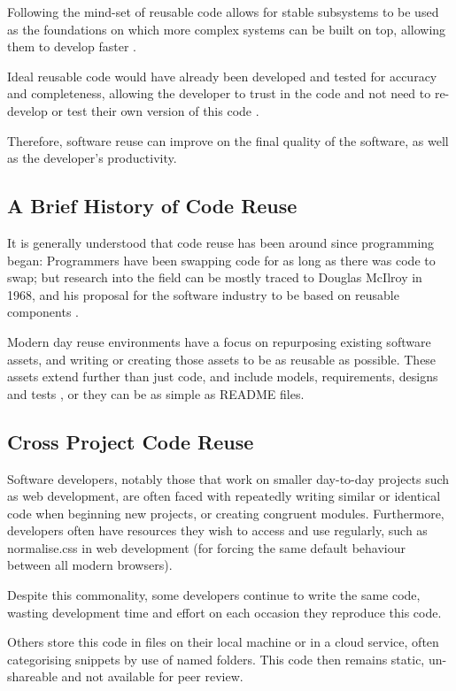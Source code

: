 \documentclass[11pt,openright,a4paper]{report}
\begin{document}
Following the mind-set of reusable code allows for stable subsystems to be used as the foundations on which more complex systems can be built on top, allowing them to develop faster \cite{Yunwen2000}.

Ideal reusable code would have already been developed and tested for accuracy and completeness, allowing the developer to trust in the code and not need to re-develop or test their own version of this code \cite{Grinter2001}.

Therefore, software reuse can improve on the final quality of the software, as well as the developer’s productivity.

\subsection{A Brief History of Code Reuse}
It is generally understood that code reuse has been around since programming began: Programmers have been swapping code for as long as there was code to swap; but research into the field can be mostly traced to Douglas McIlroy in 1968, and his proposal for the software industry to be based on reusable components \cite{Naur1969,Jacobson1997}.

Modern day reuse environments have a focus on repurposing existing software assets, and writing or creating those assets to be as reusable as possible. 
These assets extend further than just code, and include models, requirements, designs and tests \cite{Grinter2001}, or they can be as simple as README files.

\subsection{Cross Project Code Reuse}
Software developers, notably those that work on smaller day-to-day projects such as web development, are often faced with repeatedly writing similar or identical code when beginning new projects, or creating congruent modules. 
Furthermore, developers often have resources they wish to access and use regularly, such as normalise.css in web development (for forcing the same default behaviour between all modern browsers).

Despite this commonality, some developers continue to write the same code, wasting development time and effort on each occasion they reproduce this code. 

Others store this code in files on their local machine or in a cloud service, often categorising snippets by use of named folders. 
This code then remains static, un-shareable and not available for peer review. 
\end{document}
